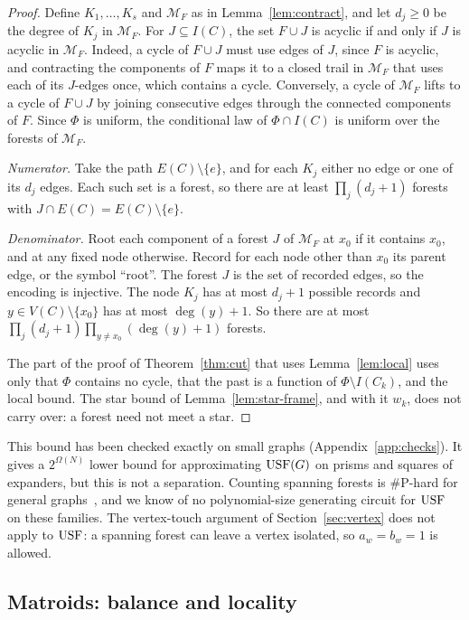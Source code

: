 \begin{proof}
Define $K_1,\dots,K_s$ and $\mathcal M_F$ as in Lemma~\ref{lem:contract}, and let $d_j\ge0$ be the degree of $K_j$ in $\mathcal M_F$. For $J\subseteq I(C)$, the set $F\cup J$ is acyclic if and only if $J$ is acyclic in $\mathcal M_F$. Indeed, a cycle of $F\cup J$ must use edges of $J$, since $F$ is acyclic, and contracting the components of $F$ maps it to a closed trail in $\mathcal M_F$ that uses each of its $J$-edges once, which contains a cycle. Conversely, a cycle of $\mathcal M_F$ lifts to a cycle of $F\cup J$ by joining consecutive edges through the connected components of $F$. Since $\Phi$ is uniform, the conditional law of $\Phi\cap I(C)$ is uniform over the forests of $\mathcal M_F$.

\emph{Numerator.} Take the path $E(C)\setminus\{e\}$, and for each $K_j$ either no edge or one of its $d_j$ edges. Each such set is a forest, so there are at least $\prod_j(d_j+1)$ forests with $J\cap E(C)=E(C)\setminus\{e\}$.

\emph{Denominator.} Root each component of a forest $J$ of $\mathcal M_F$ at $x_0$ if it contains $x_0$, and at any fixed node otherwise. Record for each node other than $x_0$ its parent edge, or the symbol ``root''. The forest $J$ is the set of recorded edges, so the encoding is injective. The node $K_j$ has at most $d_j+1$ possible records and $y\in V(C)\setminus\{x_0\}$ has at most $\deg(y)+1$. So there are at most $\prod_j(d_j+1)\prod_{y\ne x_0}(\deg(y)+1)$ forests.

The part of the proof of Theorem~\ref{thm:cut} that uses Lemma~\ref{lem:local} uses only that $\Phi$ contains no cycle, that the past is a function of $\Phi\setminus I(C_k)$, and the local bound. The star bound of Lemma~\ref{lem:star-frame}, and with it $w_k$, does not carry over: a forest need not meet a star.
\end{proof}

This bound has been checked exactly on small graphs (Appendix~\ref{app:checks}). It gives a $2^{\Omega(N)}$ lower bound for approximating $\mathrm{USF}(G)$ on prisms and squares of expanders, but this is not a separation. Counting spanning forests is \#P-hard for general graphs~\cite{JVW90}, and we know of no polynomial-size generating circuit for $\mathrm{USF}$ on these families. The vertex-touch argument of Section~\ref{sec:vertex} does not apply to $\mathrm{USF}$: a spanning forest can leave a vertex isolated, so $a_w=b_w=1$ is allowed.

\subsection{Matroids: balance and locality}\label{sec:mat-limits}

